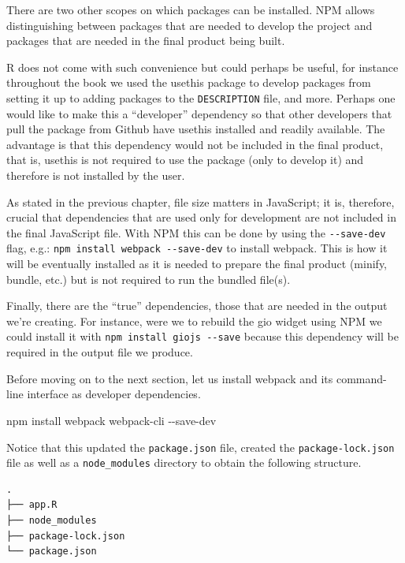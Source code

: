 \documentclass[
  10pt,
]{krantz}
\makeatletter
\newenvironment{Shaded}{\begin{snugshade}}{\end{snugshade}}
\newcommand{\ExtensionTok}[1]{#1}
\newcommand{\NormalTok}[1]{#1}
\newenvironment{kframe}{%
\medskip{}
\setlength{\fboxsep}{.8em}
 \def\at@end@of@kframe{}%
 \ifinner\ifhmode%
  \def\at@end@of@kframe{\end{minipage}}%
  \begin{minipage}{\columnwidth}%
 \fi\fi%
 \def\FrameCommand##1{\hskip\@totalleftmargin \hskip-\fboxsep
 \colorbox{shadecolor}{##1}\hskip-\fboxsep
     \hskip-\linewidth \hskip-\@totalleftmargin \hskip\columnwidth}%
 \MakeFramed {\advance\hsize-\width
   \@totalleftmargin\z@ \linewidth\hsize
   \@setminipage}}%
 {\par\unskip\endMakeFramed%
 \at@end@of@kframe}
\renewenvironment{Shaded}{\begin{kframe}}{\end{kframe}}
\makeatother
\begin{document}
There are two other scopes on which packages can be installed. NPM allows distinguishing between packages that are needed to develop the project and packages that are needed in the final product being built.

R does not come with such convenience but could perhaps be useful, for instance throughout the book we used the usethis package to develop packages from setting it up to adding packages to the \texttt{DESCRIPTION} file, and more. Perhaps one would like to make this a ``developer'' dependency so that other developers that pull the package from Github have usethis installed and readily available. The advantage is that this dependency would not be included in the final product, that is, usethis is not required to use the package (only to develop it) and therefore is not installed by the user.

As stated in the previous chapter, file size matters in JavaScript; it is, therefore, crucial that dependencies that are used only for development are not included in the final JavaScript file. With NPM this can be done by using the \texttt{-\/-save-dev} flag, e.g.: \texttt{npm\ install\ webpack\ -\/-save-dev} to install webpack. This is how it will be eventually installed as it is needed to prepare the final product (minify, bundle, etc.) but is not required to run the bundled file(s).

Finally, there are the ``true'' dependencies, those that are needed in the output we're creating. For instance, were we to rebuild the gio widget using NPM we could install it with \texttt{npm\ install\ giojs\ -\/-save} because this dependency will be required in the output file we produce.

Before moving on to the next section, let us install webpack and its command-line interface as developer dependencies.

\begin{Shaded}
\begin{Highlighting}[]
\ExtensionTok{npm}\NormalTok{ install webpack webpack{-}cli {-}{-}save{-}dev}
\end{Highlighting}
\end{Shaded}

Notice that this updated the \texttt{package.json} file, created the \texttt{package-lock.json} file as well as a \texttt{node\_modules} directory to obtain the following structure.

\begin{verbatim}
.
├── app.R
├── node_modules
├── package-lock.json
└── package.json
\end{verbatim}
\end{document}
